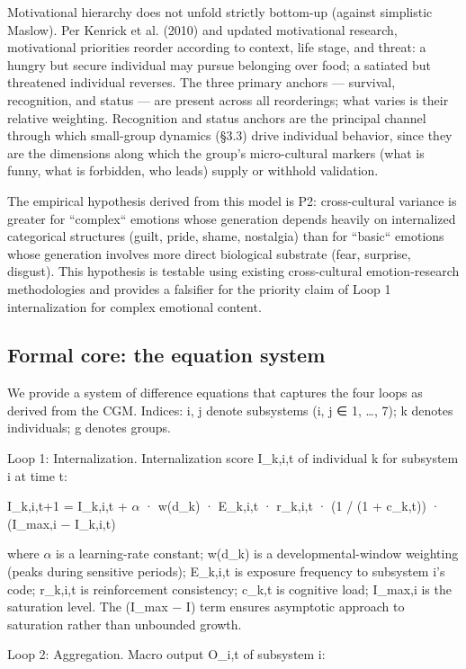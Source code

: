 \documentclass[12pt,a4paper]{article}
\begin{document}
Motivational hierarchy does not unfold strictly bottom-up (against simplistic Maslow). Per Kenrick et al. (2010) and updated motivational research, motivational priorities reorder according to context, life stage, and threat: a hungry but secure individual may pursue belonging over food; a satiated but threatened individual reverses. The three primary anchors --- survival, recognition, and status --- are present across all reorderings; what varies is their relative weighting. Recognition and status anchors are the principal channel through which small-group dynamics (§3.3) drive individual behavior, since they are the dimensions along which the group's micro-cultural markers (what is funny, what is forbidden, who leads) supply or withhold validation.


The empirical hypothesis derived from this model is P2: cross-cultural variance is greater for ``complex`` emotions whose generation depends heavily on internalized categorical structures (guilt, pride, shame, nostalgia) than for ``basic`` emotions whose generation involves more direct biological substrate (fear, surprise, disgust). This hypothesis is testable using existing cross-cultural emotion-research methodologies and provides a falsifier for the priority claim of Loop 1 internalization for complex emotional content.

\subsection{Formal core: the equation system}

We provide a system of difference equations that captures the four loops as derived from the CGM. Indices: i, j denote subsystems (i, j ∈ {1, …, 7}); k denotes individuals; g denotes groups.


Loop 1: Internalization. Internalization score I_{k,i,t} of individual k for subsystem i at time t:


I_{k,i,t+1} = I_{k,i,t} + $\alpha$ · w(d_k) · E_{k,i,t} · r_{k,i,t} · (1 / (1 + c_{k,t})) · (I_max,i − I_{k,i,t})


where $\alpha$ is a learning-rate constant; w(d_k) is a developmental-window weighting (peaks during sensitive periods); E_{k,i,t} is exposure frequency to subsystem i's code; r_{k,i,t} is reinforcement consistency; c_{k,t} is cognitive load; I_max,i is the saturation level. The (I_max − I) term ensures asymptotic approach to saturation rather than unbounded growth.


Loop 2: Aggregation. Macro output O_{i,t} of subsystem i:
\end{document}
